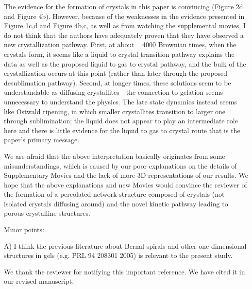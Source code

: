 \documentclass[11pt]{article}
\begin{document}
{The evidence for the formation of crystals in this paper is convincing (Figure 2d and Figure 4b). However, because of the weaknesses in the evidence presented in Figure 1c,d and Figure 4b,c, as well as from watching the supplemental movies, I do not think that the authors have adequately proven that they have observed a new crystallization pathway. First, at about ~ 4000 Brownian times, when the crystals form, it seems like a liquid to crystal transition pathway explains the data as well as the proposed liquid to gas to crystal pathway, and the bulk of the crystallization occurs at this point (rather than later through the proposed desublimation pathway). Second, at longer times, these solutions seem to be understandable as diffusing crystallites - the connection to gelation seems unnecessary to understand the physics. The late state dynamics instead seems like Ostwald ripening, in which smaller crystallites transition to larger one through sublimination; the liquid does not appear to play an intermediate role here and there is little evidence for the liquid to gas to crystal route that is the paper's primary message.
}



\bigskip
\doublespacing

We are afraid that the above interpretation basically originates from some misunderstandings, which is caused by our poor explanations on the details of Supplementary Movies and the lack of more 3D representations of our results. We hope that the above explanations and new Movies would convince the reviewer of the formation of a percolated network structure composed of crystals (not isolated crystals diffusing around) and the novel kinetic pathway leading to porous crystalline structures. 


\vspace{1em}

\singlespacing

{\bf

Minor points:

A) I think the previous literature about Bernal spirals and other one-dimensional structures in gels (e.g. PRL 94 208301 2005) is relevant to the present study.
}




\bigskip
\doublespacing

We thank the reviewer for notifying this important reference. We have cited it in our revised manuscript. 


\vspace{1em}
\end{document}
